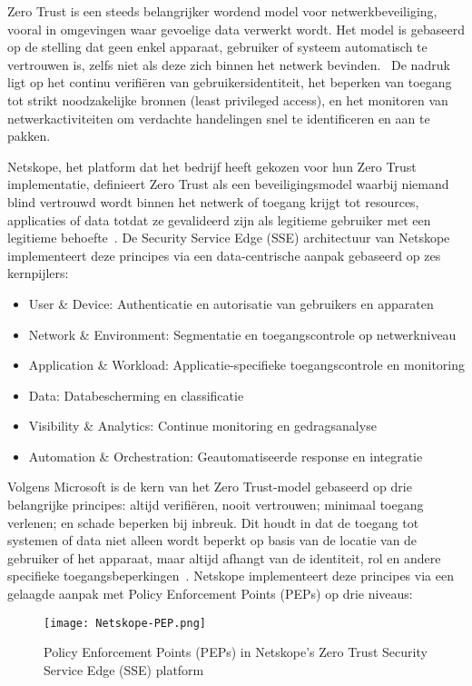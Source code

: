 Zero Trust is een steeds belangrijker wordend model voor netwerkbeveiliging, vooral in omgevingen waar gevoelige data verwerkt wordt. 
Het model is gebaseerd op de stelling dat geen enkel apparaat, gebruiker of systeem automatisch te vertrouwen is, zelfs niet als deze zich binnen het netwerk bevinden.~\autocite{Netskope2020} 
De nadruk ligt op het continu verifiëren van gebruikersidentiteit, het beperken van toegang tot strikt noodzakelijke bronnen (least privileged access), en het monitoren van netwerkactiviteiten om verdachte handelingen snel te identificeren en aan te pakken.

Netskope, het platform dat het bedrijf heeft gekozen voor hun Zero Trust implementatie, definieert Zero Trust als een beveiligingsmodel waarbij niemand blind vertrouwd wordt binnen het netwerk of toegang krijgt tot resources, applicaties of data totdat ze gevalideerd zijn als legitieme gebruiker met een legitieme behoefte~\autocite{Netskope2020}. 
De Security Service Edge (SSE) architectuur van Netskope implementeert deze principes via een data-centrische aanpak gebaseerd op zes kernpijlers:

\begin{itemize}
  \item User \& Device: Authenticatie en autorisatie van gebruikers en apparaten
  \item Network \& Environment: Segmentatie en toegangscontrole op netwerkniveau
  \item Application \& Workload: Applicatie-specifieke toegangscontrole en monitoring
  \item Data: Databescherming en classificatie
  \item Visibility \& Analytics: Continue monitoring en gedragsanalyse
  \item Automation \& Orchestration: Geautomatiseerde response en integratie
\end{itemize}

Volgens Microsoft is de kern van het Zero Trust-model gebaseerd op drie belangrijke principes: altijd verifiëren, nooit vertrouwen; minimaal toegang verlenen; en schade beperken bij inbreuk. Dit houdt in dat de toegang tot systemen of data niet alleen wordt beperkt op basis van de locatie van de gebruiker of het apparaat, maar altijd afhangt van de identiteit, rol en andere specifieke toegangsbeperkingen~\autocite{Microsoft2024}. Netskope implementeert deze principes via een gelaagde aanpak met Policy Enforcement Points (PEPs) op drie niveaus:
\begin{figure}
  \centering
  \texttt{[image: Netskope-PEP.png]}
  \caption[]{Policy Enforcement Points (PEPs) in Netskope's Zero Trust Security Service Edge (SSE) platform~\autocite{Netskope2020}}
\end{figure}

